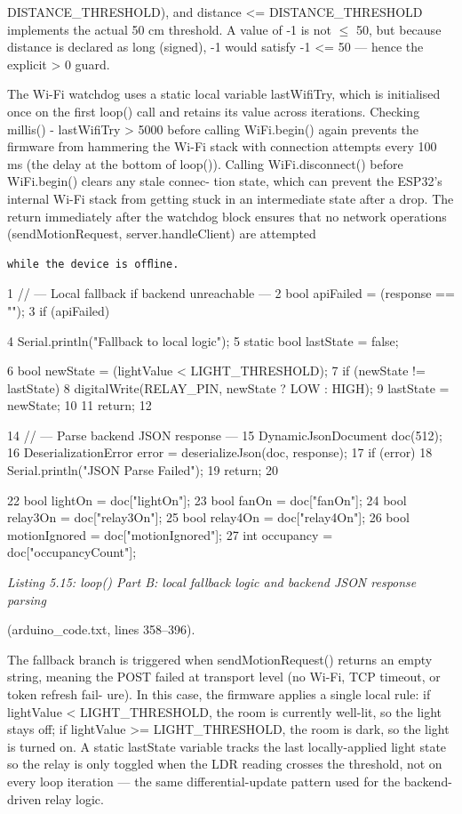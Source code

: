 {{DISTANCE\_THRESHOLD), and distance <= DISTANCE\_THRESHOLD implements the actual
50 cm threshold. A value of -1 is not $\le$ 50, but because distance is declared as long
(signed), -1 would satisfy -1 <= 50 --- hence the explicit > 0 guard.

The Wi-Fi watchdog uses a static local variable lastWifiTry, which is initialised
once on the ﬁrst loop() call and retains its value across iterations. Checking millis()
- lastWifiTry > 5000 before calling WiFi.begin() again prevents the ﬁrmware from
hammering the Wi-Fi stack with connection attempts every 100 ms (the delay at the bottom
of loop()). Calling WiFi.disconnect() before WiFi.begin() clears any stale connec-
tion state, which can prevent the ESP32's internal Wi-Fi stack from getting stuck in an
intermediate state after a drop. The return immediately after the watchdog block ensures
that no network operations (sendMotionRequest, server.handleClient) are attempted
\begin{lstlisting}
while the device is ofﬂine.
\end{lstlisting}

1 // --- Local fallback if backend unreachable ---
2 bool apiFailed = (response == "");
3 if (apiFailed) {
4 Serial.println("Fallback to local logic");
5 static bool lastState = false;




6 bool newState = (lightValue < LIGHT\_THRESHOLD);
7 if (newState != lastState) {
8 digitalWrite(RELAY\_PIN, newState ? LOW : HIGH);
9 lastState = newState;
10 }
11 return;
12 }

14 // --- Parse backend JSON response ---
15 DynamicJsonDocument doc(512);
16 DeserializationError error = deserializeJson(doc, response);
17 if (error) {
18 Serial.println("JSON Parse Failed");
19 return;
20 }

22 bool lightOn = doc["lightOn"];
23 bool fanOn = doc["fanOn"];
24 bool relay3On = doc["relay3On"];
25 bool relay4On = doc["relay4On"];
26 bool motionIgnored = doc["motionIgnored"];
27 int occupancy = doc["occupancyCount"];


\textit{Listing 5.15:      loop() Part B: local fallback logic and backend JSON response parsing}

(arduino\_code.txt, lines 358--396).


The fallback branch is triggered when sendMotionRequest() returns an empty string,
meaning the POST failed at transport level (no Wi-Fi, TCP timeout, or token refresh fail-
ure). In this case, the ﬁrmware applies a single local rule: if lightValue < LIGHT\_THRESHOLD,
the room is currently well-lit, so the light stays off; if lightValue >= LIGHT\_THRESHOLD,
the room is dark, so the light is turned on. A static lastState variable tracks the last
locally-applied light state so the relay is only toggled when the LDR reading crosses the
threshold, not on every loop iteration --- the same differential-update pattern used for the
backend-driven relay logic.

}}
